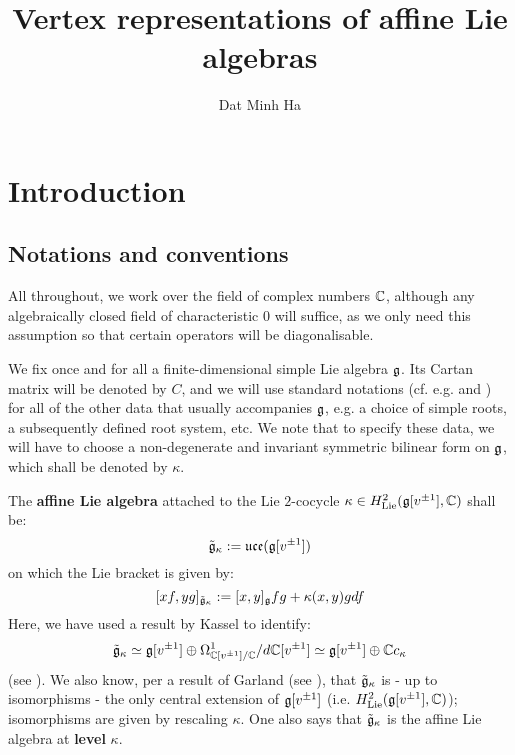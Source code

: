 

\setcounter{section}{-1}


\newcommand{\simpleroots}{\mathbb{I}}



    \title{Vertex representations of affine Lie algebras}
    
    \author{Dat Minh Ha}
    \maketitle
    
    \begin{abstract}
    
    \end{abstract}
    
    {
    \hypersetup{} 
    \tableofcontents %
    }

    \section{Introduction}
        \subsection{Notations and conventions}
            All throughout, we work over the field of complex numbers $\mathbb{C}$, although any algebraically closed field of characteristic $0$ will suffice, as we only need this assumption so that certain operators will be diagonalisable. 
    
            We fix once and for all a finite-dimensional simple Lie algebra $\mathfrak{g}$. Its Cartan matrix will be denoted by $C$, and we will use standard notations (cf. e.g. \cite{humphreys_lie_algebras} and \cite{kac_infinite_dimensional_lie_algebras}) for all of the other data that usually accompanies $\mathfrak{g}$, e.g. a choice of simple roots, a subsequently defined root system, etc. We note that to specify these data, we will have to choose a non-degenerate and invariant symmetric bilinear form on $\mathfrak{g}$, which shall be denoted by $\kappa$.
    
            The \textbf{affine Lie algebra} attached to the Lie $2$-cocycle $\kappa \in H^2_{\mathrm{Lie}}(\mathfrak{g}[v^{\pm 1}], \mathbb{C})$ shall be:
                $$\tilde{\mathfrak{g}}_{\kappa} := \mathfrak{uce}(\mathfrak{g}[v^{\pm 1}])$$
            on which the Lie bracket is given by:
                $$[xf, yg]_{\tilde{\mathfrak{g}}_{\kappa}} := [x, y]_{\mathfrak{g}} fg + \kappa(x, y) g df$$
            Here, we have used a result by Kassel to identify:
                $$\tilde{\mathfrak{g}}_{\kappa} \simeq \mathfrak{g}[v^{\pm 1}] \oplus \Omega^1_{\mathbb{C}[v^{\pm 1}]/\mathbb{C}}/d\mathbb{C}[v^{\pm 1}] \simeq \mathfrak{g}[v^{\pm 1}] \oplus \mathbb{C} c_{\kappa}$$
            (see \cite{kassel_universal_central_extensions_of_lie_algebras}). We also know, per a result of Garland (see \cite{garland_arithmetics_of_loop_groups}), that $\tilde{\mathfrak{g}}_{\kappa}$ is - up to isomorphisms - the only central extension of $\mathfrak{g}[v^{\pm 1}]$ (i.e. $H^2_{\mathrm{Lie}}(\mathfrak{g}[v^{\pm 1}], \mathbb{C})$); isomorphisms are given by rescaling $\kappa$. One also says that $\tilde{\mathfrak{g}}_{\kappa}$ is the affine Lie algebra at \textbf{level} $\kappa$.
    
